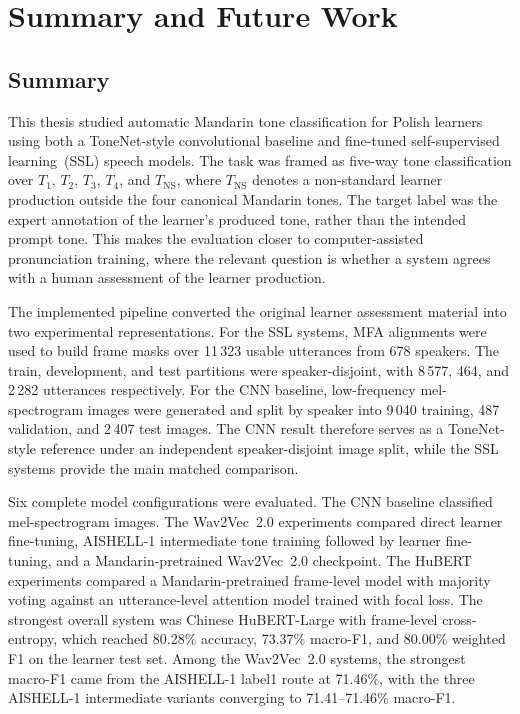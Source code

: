 
\chapter{Summary and Future Work}\label{chapter:6_Summary}

\section{Summary}
\label{sec:summary:summary}

This thesis studied automatic Mandarin tone classification for Polish learners
using both a ToneNet-style convolutional baseline and fine-tuned self-supervised
learning~(SSL) speech models. The task was framed as five-way tone classification over
\(T_1\), \(T_2\), \(T_3\), \(T_4\), and \(T_{\mathrm{NS}}\), where
\(T_{\mathrm{NS}}\) denotes a non-standard learner production outside the four
canonical Mandarin tones. The target label was the expert annotation of the
learner's produced tone, rather than the intended prompt tone. This makes the
evaluation closer to computer-assisted pronunciation training, where the
relevant question is whether a system agrees with a human assessment of the
learner production.

The implemented pipeline converted the original learner assessment material
into two experimental representations. For the SSL systems, MFA
alignments were used to build frame masks over 11\,323
usable utterances from 678 speakers. The train, development, and test partitions
were speaker-disjoint, with 8\,577, 464, and 2\,282 utterances respectively. For
the CNN baseline, low-frequency mel-spectrogram images were generated and split
by speaker into 9\,040 training, 487 validation, and 2\,407 test images. The CNN
result therefore serves as a ToneNet-style reference under an independent
speaker-disjoint image split, while the SSL systems provide the main matched
comparison.

Six complete model configurations were evaluated. The CNN baseline classified
mel-spectrogram images. The Wav2Vec~2.0 experiments compared direct learner
fine-tuning, AISHELL-1 intermediate tone training followed by learner
fine-tuning, and a Mandarin-pretrained Wav2Vec~2.0 checkpoint. The HuBERT
experiments compared a Mandarin-pretrained frame-level model with majority
voting against an utterance-level attention model trained with focal loss. The
strongest overall system was Chinese HuBERT-Large with frame-level
cross-entropy, which reached 80.28\% accuracy, 73.37\% macro-F1, and 80.00\%
weighted F1 on the learner test set. Among the Wav2Vec~2.0 systems, the
strongest macro-F1 came from the AISHELL-1 label1 route at 71.46\%, with the
three AISHELL-1 intermediate variants converging to 71.41--71.46\% macro-F1.

